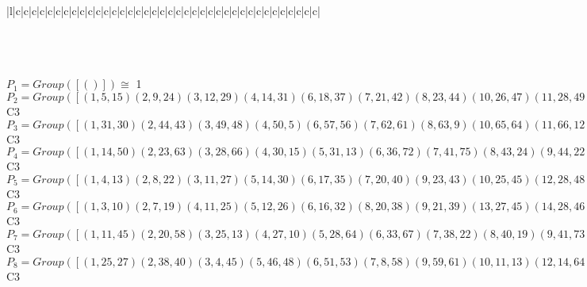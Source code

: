 \documentclass[varwidth=\maxdimen,border=10]{standalone}
\begin{document}
\begin{tabular}
\begin{array}{|l|c|c|c|c|c|c|c|c|c|c|c|c|c|c|c|c|c|c|c|c|c|c|c|c|c|c|c|c|c|c|c|c|c|c|c|c|c|c|}
\end{array}\)\\
\ \\
\ \\
$P_{1} = Group( [ () ] )\cong$ 1\ \\
$P_{2} = Group( [ ( 1, 5,15)( 2, 9,24)( 3,12,29)( 4,14,31)( 6,18,37)( 7,21,42)( 8,23,44)(10,26,47)(11,28,49)(13,30,50)(16,34,55)(17,36,57)(19,39,60)(20,41,62)(22,43,63)(25,46,65)(27,48,66)(32,52,69)(33,54,71)(35,56,72)(38,59,74)(40,61,75)(45,64,76)(51,68,78)(53,70,79)(58,73,80)(67,77,81) ] )\cong$ C3\ \\
$P_{3} = Group( [ ( 1,31,30)( 2,44,43)( 3,49,48)( 4,50, 5)( 6,57,56)( 7,62,61)( 8,63, 9)(10,65,64)(11,66,12)(13,15,14)(16,71,70)(17,72,18)(19,74,73)(20,75,21)(22,24,23)(25,76,26)(27,29,28)(32,78,77)(33,79,34)(35,37,36)(38,80,39)(40,42,41)(45,47,46)(51,81,52)(53,55,54)(58,60,59)(67,69,68) ] )\cong$ C3\ \\
$P_{4} = Group( [ ( 1,14,50)( 2,23,63)( 3,28,66)( 4,30,15)( 5,31,13)( 6,36,72)( 7,41,75)( 8,43,24)( 9,44,22)(10,46,76)(11,48,29)(12,49,27)(16,54,79)(17,56,37)(18,57,35)(19,59,80)(20,61,42)(21,62,40)(25,64,47)(26,65,45)(32,68,81)(33,70,55)(34,71,53)(38,73,60)(39,74,58)(51,77,69)(52,78,67) ] )\cong$ C3\ \\
$P_{5} = Group( [ ( 1, 4,13)( 2, 8,22)( 3,11,27)( 5,14,30)( 6,17,35)( 7,20,40)( 9,23,43)(10,25,45)(12,28,48)(15,31,50)(16,33,53)(18,36,56)(19,38,58)(21,41,61)(24,44,63)(26,46,64)(29,49,66)(32,51,67)(34,54,70)(37,57,72)(39,59,73)(42,62,75)(47,65,76)(52,68,77)(55,71,79)(60,74,80)(69,78,81) ] )\cong$ C3\ \\
$P_{6} = Group( [ ( 1, 3,10)( 2, 7,19)( 4,11,25)( 5,12,26)( 6,16,32)( 8,20,38)( 9,21,39)(13,27,45)(14,28,46)(15,29,47)(17,33,51)(18,34,52)(22,40,58)(23,41,59)(24,42,60)(30,48,64)(31,49,65)(35,53,67)(36,54,68)(37,55,69)(43,61,73)(44,62,74)(50,66,76)(56,70,77)(57,71,78)(63,75,80)(72,79,81) ] )\cong$ C3\ \\
$P_{7} = Group( [ ( 1,11,45)( 2,20,58)( 3,25,13)( 4,27,10)( 5,28,64)( 6,33,67)( 7,38,22)( 8,40,19)( 9,41,73)(12,46,30)(14,48,26)(15,49,76)(16,51,35)(17,53,32)(18,54,77)(21,59,43)(23,61,39)(24,62,80)(29,65,50)(31,66,47)(34,68,56)(36,70,52)(37,71,81)(42,74,63)(44,75,60)(55,78,72)(57,79,69) ] )\cong$ C3\ \\
$P_{8} = Group( [ ( 1,25,27)( 2,38,40)( 3, 4,45)( 5,46,48)( 6,51,53)( 7, 8,58)( 9,59,61)(10,11,13)(12,14,64)(15,65,66)(16,17,67)(18,68,70)(19,20,22)(21,23,73)(24,74,75)(26,28,30)(29,31,76)(32,33,35)(34,36,77)(37,78,79)(39,41,43)(42,44,80)(47,49,50)(52,54,56)(55,57,81)(60,62,63)(69,71,72) ] )\cong$ C3\ \\

\end{tabular}
\end{document}

